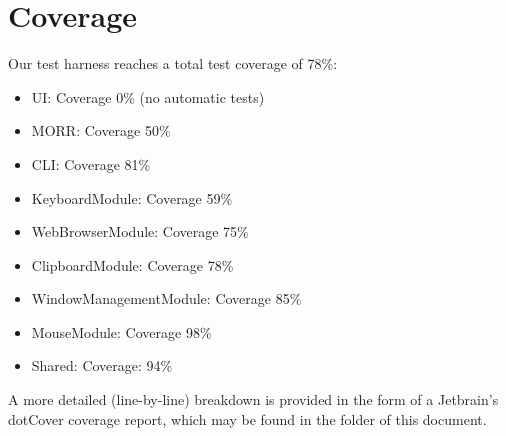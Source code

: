 \chapter{Coverage}

Our test harness reaches a total test coverage of 78\%:
\begin{itemize}
    \item UI: Coverage 0\% (no automatic tests)
    \item MORR: Coverage 50\%
    \item CLI: Coverage 81\%
    \item KeyboardModule: Coverage 59\%
    \item WebBrowserModule: Coverage 75\%
    \item ClipboardModule: Coverage 78\%
    \item WindowManagementModule: Coverage 85\%
    \item MouseModule: Coverage 98\%
    \item Shared: Coverage: 94\%
\end{itemize}

A more detailed (line-by-line) breakdown is provided in the form of a Jetbrain's dotCover coverage report, which may be found in the folder of this document.